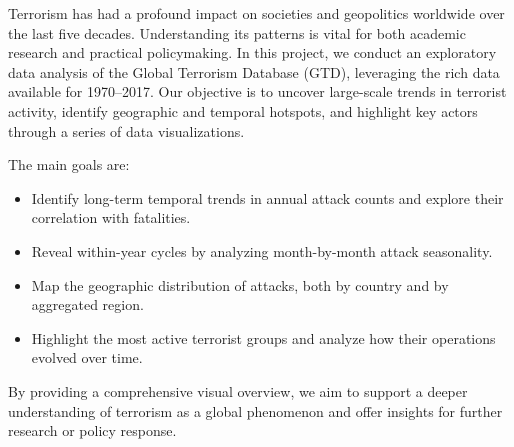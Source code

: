 Terrorism has had a profound impact on societies and geopolitics worldwide over the last five decades. Understanding its patterns is vital for both academic research and practical policymaking. In this project, we conduct an exploratory data analysis of the Global Terrorism Database (GTD), leveraging the rich data available for 1970--2017. Our objective is to uncover large-scale trends in terrorist activity, identify geographic and temporal hotspots, and highlight key actors through a series of data visualizations.

The main goals are:
\begin{itemize}
  \item Identify long-term temporal trends in annual attack counts and explore their correlation with fatalities.
  \item Reveal within-year cycles by analyzing month-by-month attack seasonality.
  \item Map the geographic distribution of attacks, both by country and by aggregated region.
  \item Highlight the most active terrorist groups and analyze how their operations evolved over time.
\end{itemize}

By providing a comprehensive visual overview, we aim to support a deeper understanding of terrorism as a global phenomenon and offer insights for further research or policy response.
